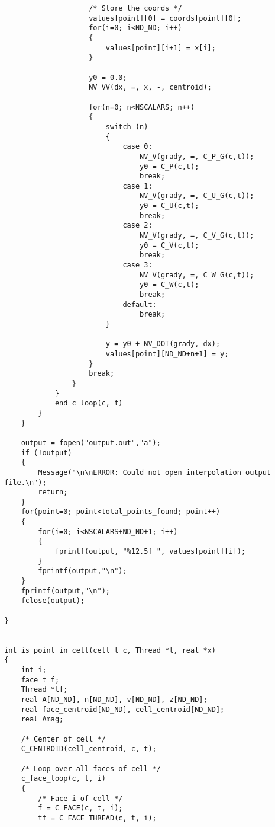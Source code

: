 \begin{verbatim}
                    /* Store the coords */
                    values[point][0] = coords[point][0];
                    for(i=0; i<ND_ND; i++)
                    {
                        values[point][i+1] = x[i];
                    }

                    y0 = 0.0;
                    NV_VV(dx, =, x, -, centroid);
            
                    for(n=0; n<NSCALARS; n++)
                    {
                        switch (n)
                        {
                            case 0:
                                NV_V(grady, =, C_P_G(c,t));
                                y0 = C_P(c,t);
                                break;
                            case 1:
                                NV_V(grady, =, C_U_G(c,t));
                                y0 = C_U(c,t);
                                break;
                            case 2:
                                NV_V(grady, =, C_V_G(c,t));
                                y0 = C_V(c,t);
                                break;
                            case 3:
                                NV_V(grady, =, C_W_G(c,t));
                                y0 = C_W(c,t);
                                break;
                            default:
                                break;
                        }

                        y = y0 + NV_DOT(grady, dx);
                        values[point][ND_ND+n+1] = y;
                    }
                    break;
                }
            }
            end_c_loop(c, t)
        }
    }

    output = fopen("output.out","a");
    if (!output)
    {
        Message("\n\nERROR: Could not open interpolation output file.\n");
        return;
    }
    for(point=0; point<total_points_found; point++)
    {
        for(i=0; i<NSCALARS+ND_ND+1; i++)
        {
            fprintf(output, "%12.5f ", values[point][i]);
        }
        fprintf(output,"\n");
    }
    fprintf(output,"\n");
    fclose(output);

}


int is_point_in_cell(cell_t c, Thread *t, real *x)
{
    int i;
    face_t f;
    Thread *tf;
    real A[ND_ND], n[ND_ND], v[ND_ND], z[ND_ND];
    real face_centroid[ND_ND], cell_centroid[ND_ND];
    real Amag;

    /* Center of cell */
    C_CENTROID(cell_centroid, c, t);

    /* Loop over all faces of cell */
    c_face_loop(c, t, i)
    {
        /* Face i of cell */
        f = C_FACE(c, t, i);
        tf = C_FACE_THREAD(c, t, i);


\end{verbatim}
